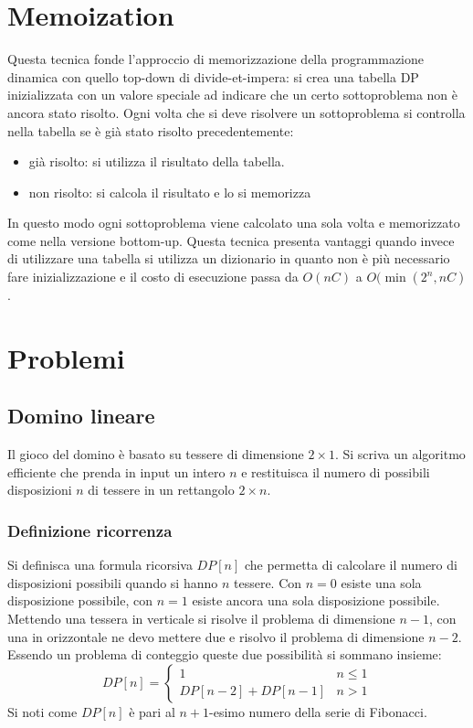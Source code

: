 \section{Memoization}
Questa tecnica fonde l'approccio di memorizzazione della programmazione dinamica con quello top-down di divide-et-impera: si crea una tabella DP inizializzata con un valore speciale ad indicare che un certo 
sottoproblema non \`e ancora stato risolto. Ogni volta che si deve risolvere un sottoproblema si controlla nella tabella se \`e gi\`a stato risolto precedentemente:
\begin{itemize}
\item gi\`a risolto: si utilizza il risultato della tabella.
\item non risolto: si calcola il risultato e lo si memorizza
\end{itemize}
In questo modo ogni sottoproblema viene calcolato una sola volta e memorizzato come nella versione bottom-up. Questa tecnica presenta vantaggi quando invece di utilizzare una tabella si utilizza un dizionario 
in quanto non \`e pi\`u necessario fare inizializzazione e il costo di esecuzione passa da $O(nC)$ a $O(\min(2^n, nC)$.

\section{Problemi}
\subsection{Domino lineare}
Il gioco del domino \`e basato su tessere di dimensione $2\times 1$. Si scriva un algoritmo efficiente che prenda in input un intero $n$ e restituisca il numero di possibili disposizioni $n$ di tessere in un 
rettangolo $2\times n$.
\subsubsection{Definizione ricorrenza}
Si definisca una formula ricorsiva $DP[n]$ che permetta di calcolare il numero di disposizioni possibili quando si hanno $n$ tessere. Con $n=0$ esiste una sola disposizione possibile, con $n=1$ esiste ancora una
sola disposizione possibile. Mettendo una tessera in verticale si risolve il problema di dimensione $n-1$, con una in orizzontale ne devo mettere due e risolvo il problema di dimensione $n-2$. Essendo un 
problema di conteggio queste due possibilit\`a si sommano insieme:
$$
DP[n]=
\begin{cases}
1\quad & n\le 1\\
DP[n-2] + DP[n-1]& n>1
\end{cases}
$$
Si noti come $DP[n]$ \`e pari al $n+1$-esimo numero della serie di Fibonacci. 
